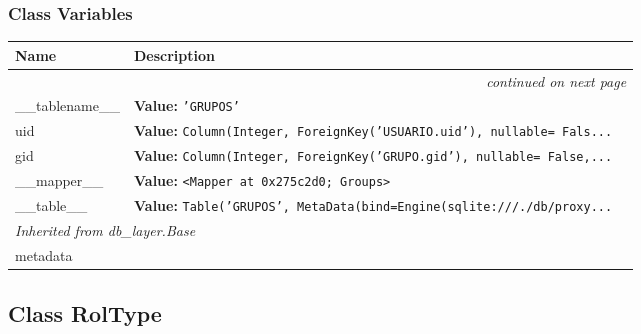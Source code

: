   \subsubsection{Class Variables}

    \vspace{-1cm}
\hspace{\varindent}\begin{longtable}{|p{\varnamewidth}|p{\vardescrwidth}|l}
\cline{1-2}
\cline{1-2} \centering \textbf{Name} & \centering \textbf{Description}& \\
\cline{1-2}
\endhead\cline{1-2}\multicolumn{3}{r}{\small\textit{continued on next page}}\\\endfoot\cline{1-2}
\endlastfoot\raggedright \_\-\_\-t\-a\-b\-l\-e\-n\-a\-m\-e\-\_\-\_\- & \raggedright \textbf{Value:} 
{\tt \texttt{'}\texttt{GRUPOS}\texttt{'}}&\\
\cline{1-2}
\raggedright u\-i\-d\- & \raggedright \textbf{Value:} 
{\tt Column(Integer, ForeignKey('USUARIO.uid'), nullable= Fals\texttt{...}}&\\
\cline{1-2}
\raggedright g\-i\-d\- & \raggedright \textbf{Value:} 
{\tt Column(Integer, ForeignKey('GRUPO.gid'), nullable= False,\texttt{...}}&\\
\cline{1-2}
\raggedright \_\-\_\-m\-a\-p\-p\-e\-r\-\_\-\_\- & \raggedright \textbf{Value:} 
{\tt {\textless}Mapper at 0x275c2d0; Groups{\textgreater}}&\\
\cline{1-2}
\raggedright \_\-\_\-t\-a\-b\-l\-e\-\_\-\_\- & \raggedright \textbf{Value:} 
{\tt Table('GRUPOS', MetaData(bind=Engine(sqlite:///./db/proxy\texttt{...}}&\\
\cline{1-2}
\multicolumn{2}{|l|}{\textit{Inherited from db\_layer.Base}}\\
\multicolumn{2}{|p{\varwidth}|}{\raggedright metadata}\\
\cline{1-2}
\end{longtable}



\subsection{Class RolType}

